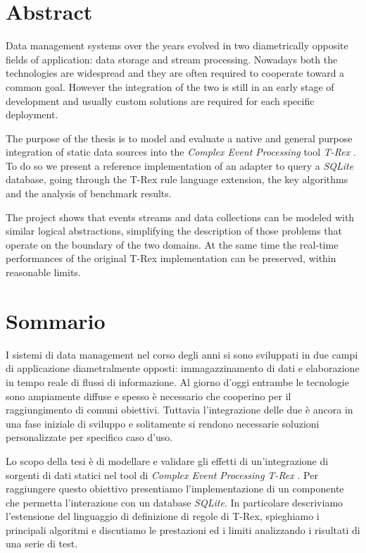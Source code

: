 \chapter*{Abstract}

Data management systems over the years evolved in two diametrically opposite fields of application: data storage and stream processing. Nowadays both the technologies are widespread and they are often required to cooperate toward a common goal. However the integration of the two is still in an early stage of development and usually custom solutions are required for each specific deployment.

The purpose of the thesis is to model and evaluate a native and general purpose integration of static data sources into the \emph{Complex Event Processing} tool \emph{T-Rex} \cite{trex}. To do so we present a reference implementation of an adapter to query a \emph{SQLite} database, going through the T-Rex rule language extension, the key algorithms and the analysis of benchmark results.

The project shows that events streams and data collections can be modeled with similar logical abstractions, simplifying the description of those problems that operate on the boundary of the two domains. At the same time the real-time performances of the original T-Rex implementation can be preserved, within reasonable limits.

\chapter*{Sommario}
I sistemi di data management nel corso degli anni si sono sviluppati in due campi di applicazione diametralmente opposti: immagazzinamento di dati e elaborazione in tempo reale di flussi di informazione. Al giorno d'oggi entrambe le tecnologie sono ampiamente diffuse e spesso è necessario che cooperino per il raggiungimento di comuni obiettivi. Tuttavia l'in\-te\-gra\-zio\-ne delle due è ancora in una fase iniziale di sviluppo e solitamente si rendono necessarie soluzioni personalizzate per specifico caso d'uso.

Lo scopo della tesi è di modellare e validare gli effetti di un'in\-te\-gra\-zio\-ne di sorgenti di dati statici nel tool di \emph{Complex Event Processing} \emph{T-Rex} \cite{trex}. Per raggiungere questo obiettivo presentiamo l'im\-ple\-men\-ta\-zio\-ne di un componente che permetta l'in\-te\-ra\-zio\-ne con un database \emph{SQLite}. In particolare descriviamo l'es\-ten\-sio\-ne del linguaggio di definizione di regole di T-Rex, spieghiamo i principali algoritmi e discutiamo le pre\-sta\-zio\-ni ed i limiti analizzando i risultati di una serie di test.

